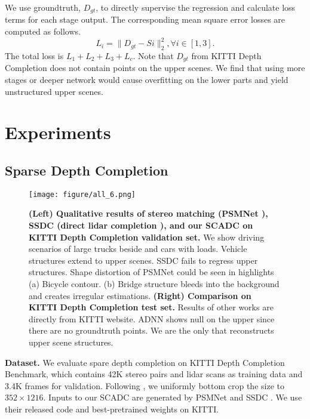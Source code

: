 \documentclass{article}
\begin{document}
We use groundtruth, $D_{gt}$, to directly supervise the regression and calculate loss terms for each stage output. The corresponding mean square error losses are computed as follows.
\begin{equation}
     L_{i}=\|D_{gt}-Si\|^2_2,  \forall i \in [1,3].
     \label{fused}
\end{equation}
The total loss is $L_1+L_2+L_3+L_c$. Note that $D_{gt}$ from KITTI Depth Completion does not contain points on the upper scenes. We find that using more stages or deeper network would cause overfitting on the lower parts and yield unstructured upper scenes.

\section{Experiments}

\vspace{-5pt}
\subsection{Sparse Depth Completion}
\vspace{-5pt}
\begin{figure*}[hbt!]
    \centering
    \texttt{[image: figure/all\_6.png]}
    \vspace{-20pt}
    \caption{\textbf{(Left) Qualitative results of stereo matching (PSMNet \cite{chang2018pyramid}), SSDC (direct lidar completion \cite{ma2019self}), and our SCADC on KITTI Depth Completion validation set.} We show driving scenarios of large trucks beside and cars with loads. Vehicle structures extend to upper scenes. SSDC fails to regress upper structures. Shape distortion of PSMNet could be seen in highlights (a) Bicycle contour. (b) Bridge structure bleeds into the background and creates irregular estimations. \textbf{(Right) Comparison on KITTI Depth Completion test set.} Results of other works are directly from KITTI website. ADNN \cite{chodosh18} shows null on the upper since there are no groundtruth points. We are the only that reconstructs upper scene structures.}
    \label{all}
    \vspace{-12pt}
\end{figure*}

\textbf{Dataset.} We evaluate spare depth completion on KITTI Depth Completion Benchmark, which contains 42K stereo pairs and lidar scans as training data and 3.4K frames for validation. Following \cite{ma2019self}, we uniformly bottom crop the size to $352\times 1216$. Inputs to our SCADC are generated by PSMNet \cite{chang2018pyramid} and SSDC \cite{ma2019self}. We use their released code and best-pretrained weights on KITTI.
\end{document}
